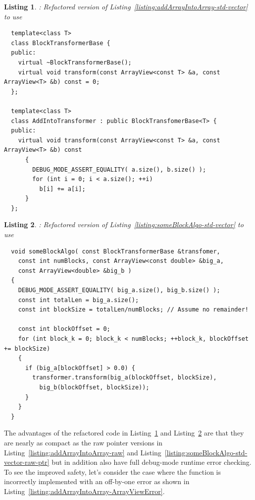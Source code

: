\documentclass[pdf,ps2pdf,11pt]{SANDreport}
\newtheorem{listing}{Listing}
\begin{document}
{}\begin{listing}: Refactored version of
Listing~\ref{listing:addArrayIntoArray-std-vector} to use
{}
\\
\label{listing:addArrayIntoArray-ArrayView}
{\small\begin{verbatim}
  template<class T>
  class BlockTransformerBase {
  public:
    virtual ~BlockTransformerBase();
    virtual void transform(const ArrayView<const T> &a, const ArrayView<T> &b) const = 0;
  };

  template<class T>
  class AddIntoTransformer : public BlockTransfomerBase<T> {
  public:
    virtual void transform(const ArrayView<const T> &a, const ArrayView<T> &b) const
      {
        DEBUG_MODE_ASSERT_EQUALITY( a.size(), b.size() );
        for (int i = 0; i < a.size(); ++i)
          b[i] += a[i];
      }
  };
\end{verbatim}}
\end{listing}


{}\begin{listing}: Refactored version of
Listing~\ref{listing:someBlockAlgo-std-vector} to use
{} \\
\label{listing:someBlockAlgo-ArrayView}
{\small\begin{verbatim}
  void someBlockAlgo( const BlockTransformerBase &transfomer,
    const int numBlocks, const ArrayView<const double> &big_a,
    const ArrayView<double> &big_b )
  {
    DEBUG_MODE_ASSERT_EQUALITY( big_a.size(), big_b.size() );
    const int totalLen = big_a.size();
    const int blockSize = totalLen/numBlocks; // Assume no remainder!
    
    const int blockOffset = 0;
    for (int block_k = 0; block_k < numBlocks; ++block_k, blockOffset += blockSize)
    {
      if (big_a[blockOffset] > 0.0) {
        transformer.transform(big_a(blockOffset, blockSize),
          big_b(blockOffset, blockSize));
      }
    }
  }
\end{verbatim}}
\end{listing}


The advantages of the refactored code in
Listing~\ref{listing:addArrayIntoArray-ArrayView} and
Listing~\ref{listing:someBlockAlgo-ArrayView} are that they are nearly
as compact as the raw pointer versions in
Listing~\ref{listing:addArrayIntoArray-raw} and
Listing~\ref{listing:someBlockAlgo-std-vector-raw-ptr} but in addition
also have full debug-mode runtime error checking.  To see the improved
safety, let's consider the case where the {}
function is incorrectly implemented with an off-by-one error as shown
in Listing~\ref{listing:addArrayIntoArray-ArrayViewError}.
\end{document}
